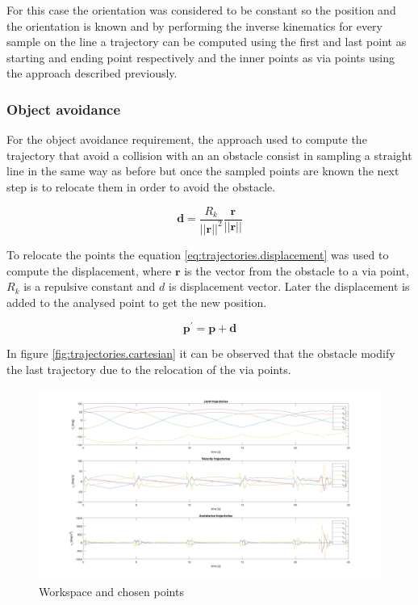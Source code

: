 \documentclass{article}
\begin{document}
For this case the orientation was considered to be constant so the position and the orientation is known and by performing the inverse kinematics for every sample on the line a trajectory can be computed using the first and last point as starting and ending point respectively and the inner points as via points using the approach described previously.

\subsubsection{Object avoidance}
For the object avoidance requirement, the approach used to compute the trajectory that avoid a collision with an an obstacle consist in sampling a straight line in the same way as before but once the sampled points are known the next step is to relocate them in order to avoid the obstacle.

\begin{equation}
\label{eq:trajectories.displacement}
\mathbf{d}=\frac{R_k}{||\mathbf{r}||^2}\frac{\mathbf{r}}{||\mathbf{r}||}
\end{equation}

To relocate the points the equation \ref{eq:trajectories.displacement} was used to compute the displacement, where $\mathbf{r}$ is the vector from the obstacle to a via point, $R_k$ is a repulsive constant and $d$ is displacement vector. Later the displacement is added to the analysed point to get the new position.

\begin{equation}
\mathbf{p}^{\prime}=\mathbf{p}+\mathbf{d}
\end{equation}

In figure \ref{fig:trajectories.cartesian} it can be observed that the obstacle modify the last trajectory due to the relocation of the via points.

\begin{figure}
\begin{center}
\includegraphics[width=\textwidth]{images/Trajectory_Joint}
\caption{Workspace and chosen points}
\label{fig:trajectories.joints}
\end{center}
\end{figure}
\end{document}
